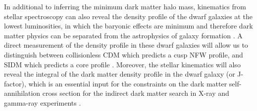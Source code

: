 In additional to inferring the minimum dark matter halo mass, kinematics from stellar spectroscopy can also reveal the density profile of the dwarf galaxies at the lowest luminosities, in which the baryonic effects are minimum and therefore dark matter physics can be separated from the astrophysics of galaxy formation \citep{governato2012,read2017}.  A direct measurement of the density profile in these dwarf galaxies will allow us to distinguish between collisionless CDM  which predicts a cusp NFW profile, and SIDM which predicts a core profile \citep{Rocha:2012jg,2012MNRAS.423.3740V}. Moreover, the stellar kinematics will also reveal the integral of the dark matter density profile in the dwarf galaxy (or J-factor), which is an essential input for the constraints on the dark matter self-annihilation cross section for the indirect dark matter search in X-ray and gamma-ray experiments \citep[e.g.][]{1108.3546}.


